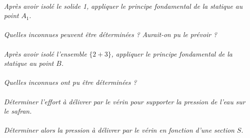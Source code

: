 \documentclass[11pt,oneside]{article}
\begin{document}
\paragraph{}
\textit{Après avoir isolé le solide 1, appliquer le principe fondamental de la statique au point $A_1$.}

\paragraph{}
\textit{Quelles inconnues peuvent être déterminées ? Aurait-on pu le prévoir ?}

\paragraph{}
\textit{Après avoir isolé l'ensemble $\{2+3\}$, appliquer le principe fondamental de la statique au point $B$.}


\paragraph{}
\textit{Quelles inconnues ont pu être déterminées ?}


\paragraph{}
\textit{Déterminer l'effort à délivrer par le vérin pour supporter la pression de l'eau sur le safran.}

\paragraph{}
\textit{Déterminer alors la pression à délivrer par le vérin en fonction d'une section $S$.}
\end{document}
